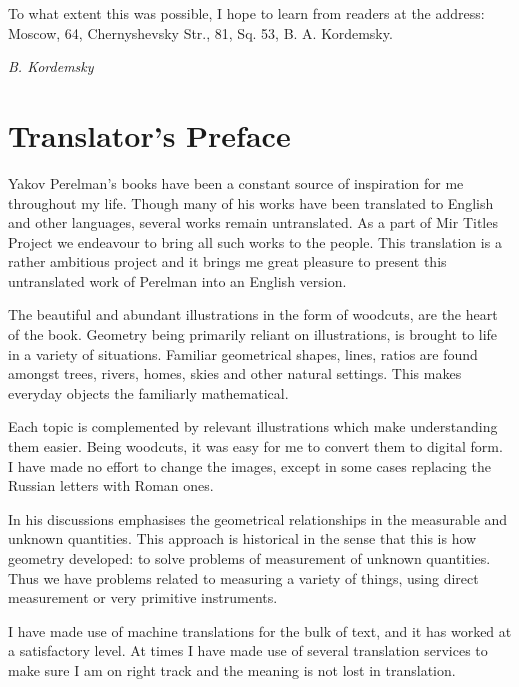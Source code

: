 To what extent this was possible, I hope to learn from readers at the address: Moscow, 64, Chernyshevsky Str., 81, Sq. 53, B. A. Kordemsky.


\begin{flushright}
\emph{B. Kordemsky}
\end{flushright}


\chapter{Translator's Preface}
\label{translator-preface}

Yakov Perelman's books have been a constant source of inspiration for me throughout my life. Though many of his works have been translated to English and other languages, several works remain untranslated. As a part of Mir Titles Project we endeavour to bring all such works to the people. This translation is a rather ambitious project and it brings me great pleasure to present this untranslated work of Perelman into an English version. 

The beautiful and abundant illustrations in the form of woodcuts, are the heart of the book. Geometry being primarily reliant on illustrations, is brought to life in a variety of situations. Familiar geometrical shapes, lines, ratios are found amongst trees, rivers, homes, skies and other natural settings. This makes everyday objects the familiarly mathematical. 

Each topic is complemented by relevant illustrations which make understanding them easier. Being woodcuts, it was easy for me to convert them to digital form. I have made no effort to change the images, except in some cases replacing the Russian letters with Roman ones.


In his discussions emphasises the geometrical relationships in the measurable and unknown quantities. This approach is historical in the sense that this is how geometry developed: to solve problems of measurement of unknown quantities. Thus we have problems related to measuring a variety of things, using direct measurement or very primitive instruments. 



I have made use of machine translations for the bulk of text, and it has worked at a satisfactory level. At times I have made use of several translation services to make sure I am on right track and the meaning is not lost in translation. 

